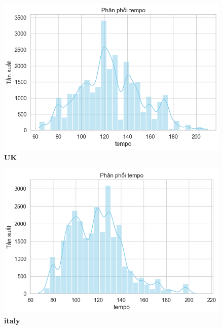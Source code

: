 \begin{itemize}
           \begin{figure}[H]
        \centering
        \begin{minipage}{0.45\textwidth}
            \centering
            \includegraphics[width=\linewidth]{../graphics/data_top50/figure/4/EDA_uk.png}
            \\[4pt] {\small \textbf{UK}}
        \end{minipage}
        \hfill
        \begin{minipage}{0.45\textwidth}
            \centering
            \includegraphics[width=\linewidth]{../graphics/data_top50/figure/4/EDA_italy.png}
            \\[4pt] {\small \textbf{italy}}
        \end{minipage}

        \vspace{0.4cm}


\end{figure}
\end{itemize}
